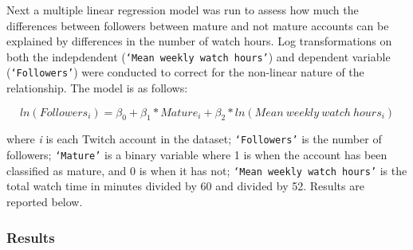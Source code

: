 \documentclass[12pt]{article}
\begin{document}
Next a multiple linear regression model was run to assess how much the differences between followers between mature and not mature accounts can be explained by differences in the number of watch hours. Log transformations on both the indepdendent (\texttt{`Mean weekly watch hours'}) and dependent variable (\texttt{`Followers'}) were conducted to correct for the non-linear nature of the relationship. The model is as follows:

\begin{equation}
ln(Followers_{i}) = \beta_{0} + \beta_{1} \ast Mature_{i} + \beta_{2} \ast ln(Mean\ weekly\ watch\ hours_{i})
\label{eq:multi_linear_model}
\end{equation}

where \emph{i} is each Twitch account in the dataset; \texttt{`Followers'} is the number of followers; \texttt{`Mature'} is a binary variable where 1 is when the account has been classified as mature, and 0 is when it has not; \texttt{`Mean weekly watch hours'} is the total watch time in minutes divided by 60 and divided by 52. Results are reported below.

\subsubsection{Results}\
\end{document}

